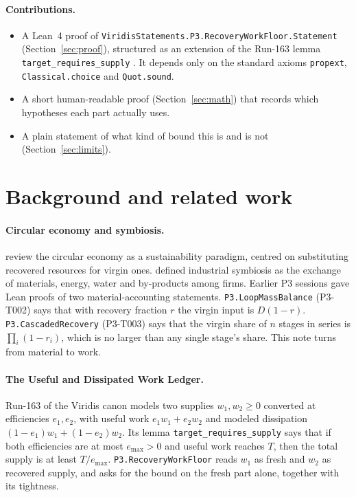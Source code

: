 \documentclass[11pt]{article}
\theoremstyle{definition}
\theoremstyle{remark}
\begin{document}
\paragraph{Contributions.}
\begin{itemize}
\item A Lean~4 proof of \texttt{ViridisStatements.P3.RecoveryWorkFloor.Statement}
(Section~\ref{sec:proof}), structured as an extension of the Run-163 lemma
\texttt{target\_requires\_supply} \citep{hart2026udwl}. It depends only on the standard axioms
\texttt{propext}, \texttt{Classical.choice} and \texttt{Quot.sound}.
\item A short human-readable proof (Section~\ref{sec:math}) that records which hypotheses each part
actually uses.
\item A plain statement of what kind of bound this is and is not (Section~\ref{sec:limits}).
\end{itemize}

\section{Background and related work}
\paragraph{Circular economy and symbiosis.}
\citet{geissdoerfer2017} review the circular economy as a sustainability paradigm, centred on
substituting recovered resources for virgin ones. \citet{chertow2000} defined industrial symbiosis
as the exchange of materials, energy, water and by-products among firms. Earlier P3 sessions gave
Lean proofs of two material-accounting statements. \texttt{P3.LoopMassBalance} (P3-T002) says that
with recovery fraction $r$ the virgin input is $D(1-r)$. \texttt{P3.CascadedRecovery} (P3-T003)
says that the virgin share of $n$ stages in series is $\prod_i(1-r_i)$, which is no larger than
any single stage's share. This note turns from material to work.

\paragraph{The Useful and Dissipated Work Ledger.}
Run-163 of the Viridis canon \citep{hart2026udwl} models two supplies $w_1,w_2\ge0$ converted at
efficiencies $e_1,e_2$, with useful work $e_1w_1+e_2w_2$ and modeled dissipation
$(1-e_1)w_1+(1-e_2)w_2$. Its lemma \texttt{target\_requires\_supply} says that if both efficiencies
are at most $e_{\max}>0$ and useful work reaches $T$, then the total supply is at least
$T/e_{\max}$. \texttt{P3.RecoveryWorkFloor} reads $w_1$ as fresh and $w_2$ as recovered supply,
and asks for the bound on the fresh part alone, together with its tightness.
\end{document}

